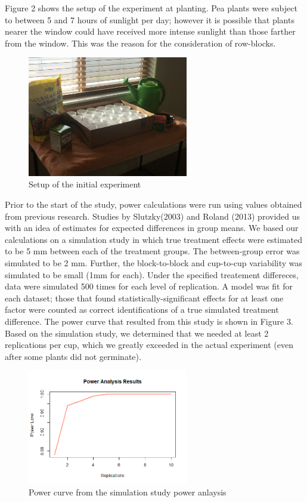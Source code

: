 \documentclass[1p,12pt]{elsarticle}\usepackage[]{graphicx}\usepackage[]{color}
\begin{document}
Figure 2 shows the setup of the experiment at planting. Pea plants were subject to between 5 and 7 hours of sunlight per day; however it is possible that plants nearer the window could have received more intense sunlight than those farther from the window. This was the reason for the consideration of row-blocks. 

 \begin{figure}[h!]
 	\caption{Setup of the initial experiment}
 	\centering
	\includegraphics[width = 7cm]{figure/setup.JPG}
\end{figure}

Prior to the start of the study, power calculations were run using values obtained from previous research. Studies by Slutzky(2003) and Roland (2013) provided us with an idea of estimates for expected differences in group means.  We based our calculations on a simulation study in which true treatment effects were estimated to be 5 mm between each of the treatment groups.  The between-group error was simulated to be 2 mm. Further, the block-to-block and cup-to-cup variability was simulated to be small (1mm for each). Under the specified treatement differeces, data were simulated 500 times for each level of replication. A model was fit for each dataset; those that found statistically-significant effects for at least one factor were counted as correct identifications of a true simulated treatment difference. The power curve that resulted from this study is shown in Figure 3.  Based on the simulation study, we determined that we needed at least 2 replications per cup, which we greatly exceeded in the actual experiment (even after some plants did not germinate). 

 \begin{figure}[h!]
 	\caption{Power curve from the simulation study power anlaysis}
 	\centering
	\includegraphics[width = 7cm]{power_unlimited_power.png}
\end{figure}
\end{document}

